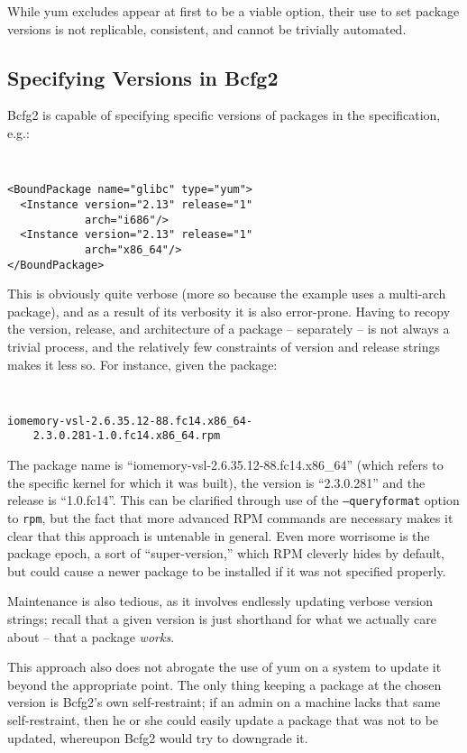 While yum excludes appear at first to be a viable option, their use to
set package versions is not replicable, consistent, and cannot be
trivially automated.

\subsection{Specifying Versions in Bcfg2}

Bcfg2 is capable of specifying specific versions of packages in the
specification, e.g.:

{\tt \small
\begin{verbatim}
<BoundPackage name="glibc" type="yum">
  <Instance version="2.13" release="1"
            arch="i686"/>
  <Instance version="2.13" release="1"
            arch="x86_64"/>
</BoundPackage>
\end{verbatim}
}

This is obviously quite verbose (more so because the example uses a
multi-arch package), and as a result of its verbosity it is also
error-prone.  Having to recopy the version, release, and architecture
of a package -- separately -- is not always a trivial process, and the
relatively few constraints of version and release strings makes it
less so.  For instance, given the package:

{\tt \small
\begin{verbatim}
iomemory-vsl-2.6.35.12-88.fc14.x86_64-
    2.3.0.281-1.0.fc14.x86_64.rpm
\end{verbatim}
}

The package name is ``iomemory-vsl-2.6.35.12-88.fc14.x86\_64'' (which
refers to the specific kernel for which it was built), the version is
``2.3.0.281'' and the release is ``1.0.fc14''.  This can be
clarified through use of the \texttt{--queryformat} option to
\texttt{rpm}, but the fact that more advanced RPM commands are
necessary makes it clear that this approach is untenable in general.
Even more worrisome is the package epoch, a sort of ``super-version,''
which RPM cleverly hides by default, but could cause a newer package
to be installed if it was not specified properly.

Maintenance is also tedious, as it involves endlessly updating verbose
version strings; recall that a given version is just shorthand for
what we actually care about -- that a package \emph{works}.

This approach also does not abrogate the use of yum on a system to
update it beyond the appropriate point.  The only thing keeping a
package at the chosen version is Bcfg2's own self-restraint; if an
admin on a machine lacks that same self-restraint, then he or she
could easily update a package that was not to be updated, whereupon
Bcfg2 would try to downgrade it.


